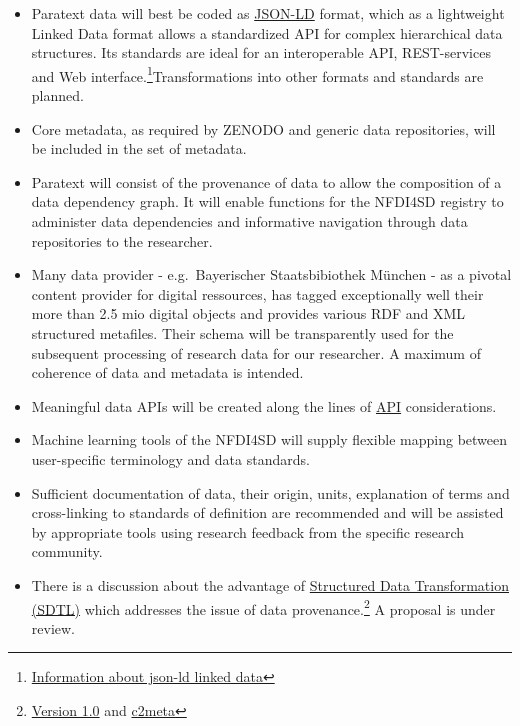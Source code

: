 \documentclass[
  english,
  paper=a4,
  oneside,captions=tableheading
]{scrbook}
\providecommand{\tightlist}{%
  \setlength{\itemsep}{0pt}\setlength{\parskip}{0pt}}
\begin{document}
\begin{itemize}
\tightlist
\item
  Paratext data will best be coded as
  \href{https://json-ld.org/}{JSON-LD} format, which as a lightweight
  Linked Data format allows a standardized API for complex hierarchical
  data structures. Its standards are ideal for an interoperable API,
  REST-services and Web interface.\footnote{\href{https://json-ld.org/learn.html}{Information
    about json-ld linked data}}Transformations into other formats and
  standards are planned.
\item
  Core metadata, as required by ZENODO and generic data repositories,
  will be included in the set of metadata.
\item
  Paratext will consist of the provenance of data to allow the
  composition of a data dependency graph. It will enable functions for
  the NFDI4SD registry to administer data dependencies and informative
  navigation through data repositories to the researcher.
\item
  Many data provider - e.g.~Bayerischer Staatsbibiothek München - as a
  pivotal content provider for digital ressources, has tagged
  exceptionally well their more than 2.5 mio digital objects and
  provides various RDF and XML structured metafiles. Their schema will
  be transparently used for the subsequent processing of research data
  for our researcher. A maximum of coherence of data and metadata is
  intended.
\item
  Meaningful data APIs will be created along the lines of
  \href{https://rollout.io/blog/json-ld-building-meaningful-data-apis/}{API}
  considerations.
\item
  Machine learning tools of the NFDI4SD will supply flexible mapping
  between user-specific terminology and data standards.
\item
  Sufficient documentation of data, their origin, units, explanation of
  terms and cross-linking to standards of definition are recommended and
  will be assisted by appropriate tools using research feedback from the
  specific research community.
\item
  There is a discussion about the advantage of
  \href{https://ddialliance.org/announcement/public-review-structured-data-transformation-language-sdtl}{Structured
  Data Transformation (SDTL)} which addresses the issue of data
  provenance.\footnote{\href{http://c2metadata.gitlab.io/sdtl-docs/master/summary/}{Version
    1.0} and \href{http://c2metadata.org/}{c2meta}} A proposal is under
  review.
\end{itemize}
\end{document}
